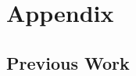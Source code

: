 \documentclass[11pt]{article}
\begin{document}
\begin{comment}
        Summing over all vertices in $V_{i,i}$ we obtain
        \[\Delta^+_{f_i|_{\tilde{V}}}(V_{i,i}) \leq \sum_{e \in E(V_{i,i}, P_i)} f(e) + \sum_{e \in E(V_{i,i}, Q_i)} f(e) + \frac{4}{\psi} \operatorname{vol}_W(P_i \cup Q_i)\]
        Since $e(V_{i,i}, Q_i) \leq \frac{5 \cdot \phi}{\psi^2} \operatorname{vol}(Q_i)$ we can bound the second term by $\frac{5}{\psi^2} \operatorname{vol}(Q_i)$. Moreover, any flow flowing into $P_i$ either has to flow out again or is stuck at some vertex. But the amount of flow stuck at some vertex can be at most $O(\deg(v))$. Hence, we can bound the second term by $O(\frac{5}{\psi^2} \operatorname{vol}(P_i))$ as well. These two facts together yield the bound on $\Delta^+_{f_i|_{\tilde{V}}}(V_{i,i})$ of the claim. Following a similar line of argument, we can also establish that 
        \[\Delta^-_{f_i|_{\tilde{V}}}(v) \leq \sum_{e \in E(P_i, v)} f(e) + \sum_{e \in E(Q_i, v)} f(e)\]
        and obtain from it the bound on $\Delta^+_{f_i|_{\tilde{V}}}(V_{i,i})$ of the claim.
    \end{proof}
    It is clear that the same argument yields that 
    \begin{align}
        \Delta^+_{g_i|_{\tilde{V}}}(V_{i+1,i}) & \leq \text{vol}(P_{i+1}) + \text{vol}(Q_i) \\
        \Delta^-_{g_i|_{\tilde{V}}}(V_{i+1,i}) & \leq \text{vol}(P_{i+1}) + \text{vol}(Q_i)
    \end{align}
    and thus we may bound the run time by 
    \[O\left(h \cdot \sum_{i} (\text{vol}(P_i) + \text{vol}(Q_i)) \right) \leq O\left(|D|\log(m)/\phi^2\right) \]
\end{proof}

\end{comment}




\newpage

\appendix 
\section{Appendix}


\subsection{Previous Work}
\label{subsec:prevWork}
\end{document}
